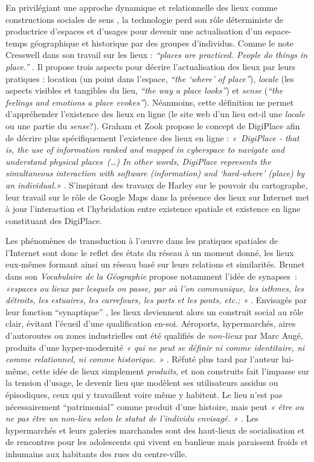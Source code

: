 En privilégiant une approche dynamique et relationnelle des lieux comme constructions sociales de sens \citep{Kyle2007}, la technologie perd son rôle déterministe de productrice d’espaces et d’usages pour devenir une actualisation d’un espace-temps géographique et historique par des groupes d’individus. Comme le note Cresswell dans son travail sur les lieux : \textit{“places are practiced. People do things in place.”} \citep{Cresswell2004}. Il propose trois aspects pour décrire l’actualisation des lieux par leurs pratiques : location (un point dans l’espace, \textit{“the ‘where’ of place”}), \textit{locale} (les aspects visibles et tangibles du lieu, \textit{“the way a place looks”}) et \textit{sense} (\textit{“the feelings and emotions a place evokes”}). Néanmoins, cette définition ne permet d’appréhender l’existence des lieux en ligne (le site web d’un lieu est-il une \textit{locale} ou une partie du \textit{sense}?). Graham et Zook propose le concept de DigiPlace afin de décrire plus spécifiquement l’existence des lieux en ligne : \textit{« DigiPlace - that is, the use of information ranked and mapped in cyberspace to navigate and understand physical places (…) In other words, DigiPlace represents the simultaneous interaction with software (information) and `hard-where' (place) by an individual.»} \citep{Zook2007}. S’inspirant des travaux de Harley sur le pouvoir du cartographe, leur travail sur le rôle de Google Maps dans la présence des lieux sur Internet met à jour l’interaction et l’hybridation entre existence spatiale et existence en ligne constituant des DigiPlace. 

Les phénomènes de transduction à l’œuvre dans les pratiques spatiales de l’Internet sont donc le reflet des états du réseau à un moment donné, les lieux eux-mêmes formant ainsi un réseau basé sur leurs relations et similarités. Brunet dans son \textit{Vocabulaire de la Géographie} propose notamment l’idée de synapses : \textit{«espaces ou lieux par lesquels on passe, par où l'on communique, les isthmes, les détroits, les estuaires, les carrefours, les ports et les ponts, etc.; »} \citep{Brunet1972}. Envisagés par leur fonction “synaptique” , les lieux deviennent alors un construit social au rôle clair, évitant l’écueil d’une qualification en-soi. Aéroports, hypermarchés, aires d’autoroutes ou zones industrielles ont été qualifiés de \textit{non-lieux} par Marc Augé, produits d’une  hyper-modernité \textit{« qui ne peut se définir ni comme identitaire, ni comme relationnel, ni comme historique. »} \citep{Auge1995}. Réfuté plus tard par l’auteur lui-même, cette idée de lieux simplement \textit{produits}, et non construits fait l’impasse sur la tension d’usage, le devenir lieu que modèlent ses utilisateurs assidus ou épisodiques, ceux qui y travaillent voire même y habitent. Le lieu n’est pas nécessairement “patrimonial” comme produit d’une histoire, mais peut \textit{« être ou ne pas être un non-lieu selon le statut de l'individu envisagé. »} \citep{Debarbieux1993}. Les hypermarchés et leurs galeries marchandes sont des haut-lieux de socialisation et de rencontres pour les adolescents qui vivent en banlieue \citep{Matthews2000} mais paraissent froids et inhumains aux habitants des rues du centre-ville.

